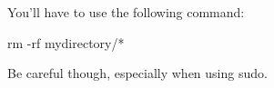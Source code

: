 You'll have to use the following command: 
\begin{cmdblock}
rm -rf mydirectory/*
\end{cmdblock}
Be careful though, especially when using sudo.